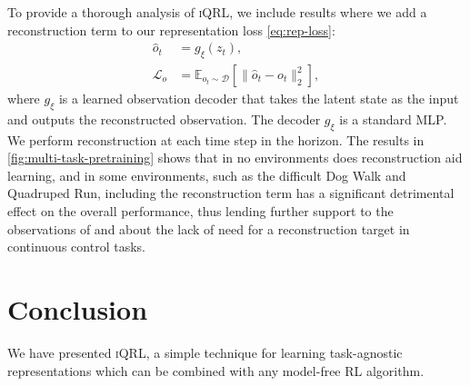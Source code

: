 \documentclass{article}
\theoremstyle{plain}
\theoremstyle{definition}
\theoremstyle{remark}
\newcommand{\our}{\textsc{iQRL}\xspace}
\begin{document}
To provide a thorough analysis of \our, we include results where we add a reconstruction term to our representation loss \cref{eq:rep-loss}:
\begin{align*}
	\hat{o}_t &= g_\xi(z_t), \\
	\mathcal{L}_o &= \mathbb{E}_{o_t\sim\mathcal{D}} [\| \hat{o}_t - o_t \|_2^2],
\end{align*}
where $g_\xi$ is a learned observation decoder that takes the latent state as the input and outputs the reconstructed observation. The decoder $g_\xi$ is a standard MLP. We perform reconstruction at each time step in the horizon.
The results in \cref{fig:multi-task-pretraining} shows that in no environments does reconstruction aid learning, and in some environments, such as the difficult Dog Walk and Quadruped Run, including the reconstruction term has a significant detrimental effect on the overall performance, thus lending further support to the observations of \citet{zhaoSimplifiedTemporalConsistency2023} and \citet{hansenTemporalDifferenceLearning2022} about the lack of need for a reconstruction target in continuous control tasks.









\section{Conclusion}
\label{conclusion}
We have presented \our, a simple technique for learning task-agnostic representations which can be combined with
any model-free RL algorithm.
\end{document}
